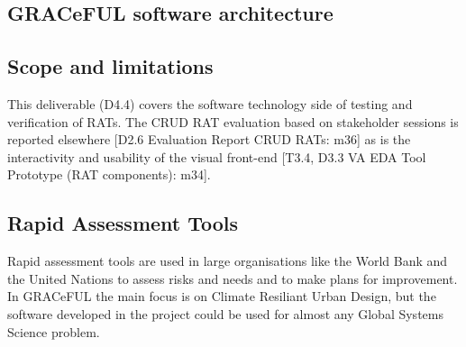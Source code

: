 
\subsection{GRACeFUL software architecture}




\subsection{Scope and limitations}

This deliverable (D4.4) covers the software technology side of testing
and verification of RATs.
%
The CRUD RAT evaluation based on stakeholder sessions is reported
elsewhere [D2.6 Evaluation Report CRUD RATs: m36] as is the
interactivity and usability of the visual front-end [T3.4, D3.3 VA EDA
  Tool Prototype (RAT components): m34].

\subsection{Rapid Assessment Tools}

Rapid assessment tools are used in large organisations like the World
Bank and the United Nations to assess risks and needs and to make
plans for improvement.
In GRACeFUL the main focus is on Climate Resiliant Urban Design, but
the software developed in the project could be used for almost any
Global Systems Science problem.


